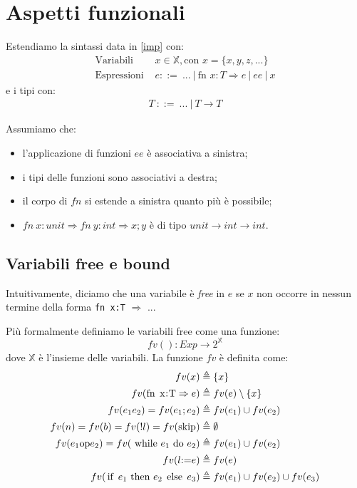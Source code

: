 \documentclass[a4paper, 11pt]{article}
\newcommand{\code}[1]{\textup{\lstinline|#1|}}
\begin{document}
\section{Aspetti funzionali}
Estendiamo la sintassi data in \ref{imp} con:	 \begin{align*}
	\text{Variabili } &x \in \mathbb{X}, \text{con } x = \lbrace x,y,z,...\rbrace \\
	\text{Espressioni }&e::=\ ...\ |\ \text{fn }x:T \Rightarrow e\ |\ ee\ |\ x
\end{align*}
e i tipi con: \begin{align*}
	T\ ::=\ ...\ |\ T \to T
\end{align*}

Assumiamo che: \begin{itemize}
	\item l'applicazione di funzioni $ee$ è associativa a sinistra;
	\item i tipi delle funzioni sono associativi a destra;
	\item il corpo di $fn$ si estende a sinistra quanto più è possibile;
	\item $fn\ x:unit \Rightarrow fn\ y:int \Rightarrow x;y$ è di tipo $unit \to int \to int$.
\end{itemize}

\subsection{Variabili free e bound}
Intuitivamente, diciamo che una variabile è \textit{free} in $e$ se $x$ non occorre in nessun termine della forma \lstinline|fn x:T| $\Rightarrow$ ...

Più formalmente definiamo le variabili free come una funzione: \[ fv(): Exp \to 2^\mathbb{X} \] dove $\mathbb{X}$ è l'insieme delle variabili. La funzione $fv$ è definita come: \begin{align*}
	fv(x) &\triangleq \lbrace x \rbrace \\
	fv(\code{fn x:T} \Rightarrow e) &\triangleq fv(e) \setminus \lbrace x \rbrace \\
	fv(e_1 e_2)= fv (e_1;e_2) &\triangleq fv(e_1) \cup fv(e_2) \\
	fv(n)=fv(b)=fv(!l)=fv(\code{skip}) &\triangleq \emptyset \\
	fv(e_1 \code{op} e_2) = fv(\ \code{while}\ e_1\ \code{do}\ e_2) &\triangleq fv(e_1) \cup fv(e_2) \\
	fv(l \code{:=} e) &\triangleq fv(e) \\
	fv(\code{if}\ e_1\ \code{then}\ e_2\ \code{else}\ e_3) &\triangleq fv(e_1) \cup fv(e_2) \cup fv(e_3)
\end{align*}
\end{document}

